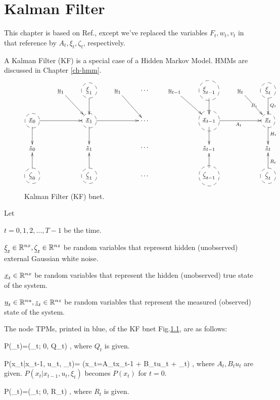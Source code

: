 \chapter{Kalman Filter}\label{ch-kalman}

This
chapter is based on Ref.\cite{wiki-kalman},
except we've replaced the
variables $F_t, w_t, v_t$ in that reference by 
$A_t, \xi_t,\zeta_t$, respectively.

A Kalman Filter (KF) is a special case of a
Hidden Markov Model. HMMs are
 discussed in Chapter \ref{ch-hmm}.

\begin{figure}[h!]
\centering
$$\xymatrix{
&\rvu_1\ar[dr]
&*++[F-o]{\rvxi_1}\ar[d]
&\rvu_1\ar[dr]
&\cdots
&\rvu_{t-1}\ar[dr]
&*++[F-o]{\rvxi_{t-1}}\ar[d]
&\rvu_t\ar[dr]|{B_t}
&*++[F-o]{\rvxi_{t}}\ar[d]^{Q_t}
\\
*++[F-o]{\rvx_0}\ar[d]\ar[rr]
&&*++[F-o]{\rvx_1}\ar[d]\ar[rr]
&&\cdots
&&*++[F-o]{\rvx_{t-1}}\ar[d]\ar[rr]_{A_t}
&&*++[F-o]{\rvx_{t}}\ar[d]^{H_t}
\\
\rvz_0
&&\rvz_1
&&\cdots
&&\rvz_{t-1}
&
&\rvz_{t}
\\
*++[F-o]{\rvzeta_0}\ar[u]
&&*++[F-o]{\rvzeta_1}\ar[u]
&&\cdots
&&*++[F-o]{\rvzeta_{t-1}}\ar[u]
&&*++[F-o]{\rvzeta_{t}}\ar[u]_{R_t}
}$$
\caption{Kalman Filter (KF) bnet.}
\label{fig-kal}
\end{figure}

Let 

$t=0, 1, 2, \dots , T-1$ be the time.

${\underline{\xi}}_t\in{ \mathbb{R}}^{nx},
 {\underline{\zeta}}_t\in { \mathbb{R}}^{nz}$ be
random variables that represent
hidden (unobserved)   external
Gaussian white noise.

${\underline{x}}_t\in { \mathbb{R}}^{nx}$ be
random variables that represent
the hidden (unobserved) true
state of the system.

${\underline{u}}_t\in { \mathbb{R}}^{nu}, 
{\underline{z}}_t\in { \mathbb{R}}^{nz}$ be
random variables that represent
the measured (observed) 
state of the system.


The 
node TPMs,
printed in blue,
of the KF bnet Fig.\ref{fig-kal},
are as follows:

\beq\color{blue}
P(\xi_t)=\caln(\xi_t; 0, Q_t)
\;,
\eeq
where $Q_t$ is given.


\beq\color{blue}
P(x_t|x_{t-1}, u_t, \xi_t)=
\indi(x_t=A_tx_{t-1} + B_tu_t + \xi_t)
\;,
\eeq
where $A_t, B_tu_t$
are given. $P(x_t|x_{t-1}, u_t, \xi_t)$
 becomes $P(x_t)$
for $t=0$.

\beq\color{blue}
P(\zeta_t)=\caln(\zeta_t; 0, R_t)
\;,
\eeq
where $R_t$ is given.

